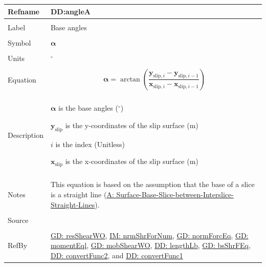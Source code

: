 \documentclass[12pt]{article}
\begin{document}
\noindent \begin{minipage}{\textwidth}
\begin{tabular}{>{\raggedright}p{}>{\raggedright\arraybackslash}p{}}
\toprule \textbf{Refname} & \textbf{DD:angleA}
\label{DD:angleA}
\\ \midrule \\
Label & Base angles
\\ \midrule \\
Symbol & $\mathbf{α}$
\\ \midrule \\
Units & ${}^{\circ}$
\\ \midrule \\
Equation & \begin{displaymath}
           \mathbf{α}=\arctan\left(\frac{{\mathbf{y}_{\text{slip},i}}-{\mathbf{y}_{\text{slip},i-1}}}{{\mathbf{x}_{\text{slip},i}}-{\mathbf{x}_{\text{slip},i-1}}}\right)
           \end{displaymath}
\\ \midrule \\
Description & \begin{symbDescription}
              \item{$\mathbf{α}$ is the base angles (${}^{\circ}$)}
              \item{${\mathbf{y}_{\text{slip}}}$ is the y-coordinates of the slip surface (m)}
              \item{$i$ is the index (Unitless)}
              \item{${\mathbf{x}_{\text{slip}}}$ is the x-coordinates of the slip surface (m)}
              \end{symbDescription}
\\ \midrule \\
Notes & This equation is based on the assumption that the base of a slice is a straight line (\hyperref[assumpSBSBISL]{A: Surface-Base-Slice-between-Interslice-Straight-Lines}).
\\ \midrule \\
Source & \cite{fredlund1977}
\\ \midrule \\
RefBy & \hyperref[GD:resShearWO]{GD: resShearWO}, \hyperref[IM:nrmShrForNum]{IM: nrmShrForNum}, \hyperref[GD:normForcEq]{GD: normForcEq}, \hyperref[GD:momentEql]{GD: momentEql}, \hyperref[GD:mobShearWO]{GD: mobShearWO}, \hyperref[DD:lengthLb]{DD: lengthLb}, \hyperref[GD:bsShrFEq]{GD: bsShrFEq}, \hyperref[DD:convertFunc2]{DD: convertFunc2}, and \hyperref[DD:convertFunc1]{DD: convertFunc1}
\\ \bottomrule
\end{tabular}
\end{minipage}
\par~
\end{document}
